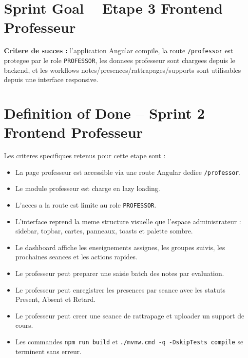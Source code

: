 \documentclass[12pt,a4paper]{report}
\begin{document}
\section{Sprint Goal -- Etape 3 Frontend Professeur}

\begin{center}
\end{center}

\textbf{Critere de succes :} l'application Angular compile, la route \texttt{/professor} est protegee par le role \texttt{PROFESSOR}, les donnees professeur sont chargees depuis le backend, et les workflows notes/presences/rattrapages/supports sont utilisables depuis une interface responsive.

\section{Definition of Done -- Sprint 2 Frontend Professeur}

Les criteres specifiques retenus pour cette etape sont :

\begin{itemize}[itemsep=0.4em]
    \item La page professeur est accessible via une route Angular dediee \texttt{/professor}.
    \item Le module professeur est charge en lazy loading.
    \item L'acces a la route est limite au role \texttt{PROFESSOR}.
    \item L'interface reprend la meme structure visuelle que l'espace administrateur : sidebar, topbar, cartes, panneaux, toasts et palette sombre.
    \item Le dashboard affiche les enseignements assignes, les groupes suivis, les prochaines seances et les actions rapides.
    \item Le professeur peut preparer une saisie batch des notes par evaluation.
    \item Le professeur peut enregistrer les presences par seance avec les statuts Present, Absent et Retard.
    \item Le professeur peut creer une seance de rattrapage et uploader un support de cours.
    \item Les commandes \texttt{npm run build} et \texttt{./mvnw.cmd -q -DskipTests compile} se terminent sans erreur.
\end{itemize}
\end{document}
